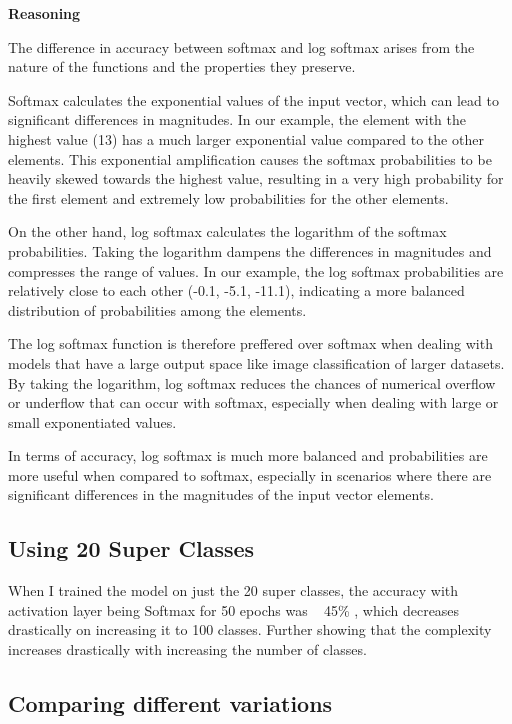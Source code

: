 \documentclass{article}
\begin{document}
\textbf{Reasoning}

The difference in accuracy between softmax and log softmax arises from the nature of the functions and the properties they preserve.

Softmax calculates the exponential values of the input vector, which can lead to significant differences in magnitudes. In our example, the element with the highest value (13) has a much larger exponential value compared to the other elements. This exponential amplification causes the softmax probabilities to be heavily skewed towards the highest value, resulting in a very high probability for the first element and extremely low probabilities for the other elements.

On the other hand, log softmax calculates the logarithm of the softmax probabilities. Taking the logarithm dampens the differences in magnitudes and compresses the range of values. In our example, the log softmax probabilities are relatively close to each other (-0.1, -5.1, -11.1), indicating a more balanced distribution of probabilities among the elements.

The log softmax function is therefore preffered over softmax when dealing with models that have a large output space like image classification of larger datasets. By taking the logarithm, log softmax reduces the chances of numerical overflow or underflow that can occur with softmax, especially when dealing with large or small exponentiated values.

In terms of accuracy, log softmax is much more balanced and probabilities are more useful when compared to softmax, especially in scenarios where there are significant differences in the magnitudes of the input vector elements.

\subsection{Using 20 Super Classes}

When I trained the model on just the 20 super classes, the accuracy with activation layer being Softmax for 50 epochs was ~ 45\% , which decreases drastically on increasing it to 100 classes. Further showing that the complexity increases drastically with increasing the number of classes.

\subsection{Comparing different variations}
\end{document}
